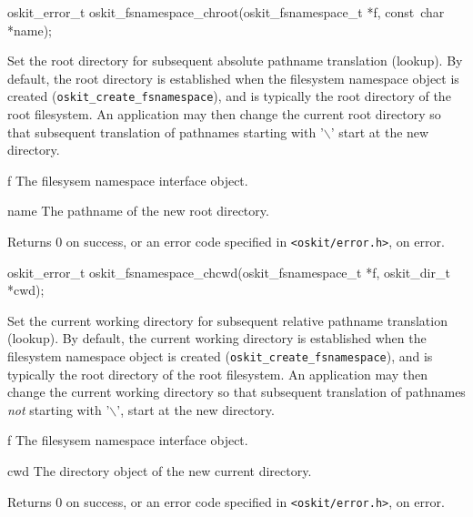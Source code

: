 \begin{apisyn}

	\funcproto oskit_error_t
	oskit_fsnamespace_chroot(oskit_fsnamespace_t *f, const~char *name);
\end{apisyn}
\begin{apidesc}
	Set the root directory for subsequent absolute pathname translation
	(lookup). By default, the root directory is established when the
	filesystem namespace object is created
	(\texttt{oskit_create_fsnamespace}), and is typically the root
	directory of the root filesystem. An application may then change
	the current root directory so that subsequent translation of
	pathnames starting with '$\backslash$' start at the new directory. 
\end{apidesc}
\begin{apiparm}
	\item[f]
		The \oskit{} filesysem namespace interface object.
	\item[name]
		The pathname of the new root directory.
\end{apiparm}
\begin{apiret}
	Returns 0 on success, or an error code specified in
	{\tt <oskit/error.h>}, on error.
\end{apiret}


\begin{apisyn}

	\funcproto oskit_error_t
	oskit_fsnamespace_chcwd(oskit_fsnamespace_t *f, oskit_dir_t *cwd);
\end{apisyn}
\begin{apidesc}
	Set the current working directory for subsequent relative pathname
	translation (lookup). By default, the current working directory is
	established when the filesystem namespace object is created
	(\texttt{oskit_create_fsnamespace}), and is typically the root
	directory of the root filesystem. An application may then change
	the current working directory so that subsequent translation of
	pathnames \emph{not} starting with '$\backslash$', start at the new directory.
\end{apidesc}
\begin{apiparm}
	\item[f]
		The \oskit{} filesysem namespace interface object.
	\item[cwd]
		The directory object of the new current directory.
\end{apiparm}
\begin{apiret}
	Returns 0 on success, or an error code specified in
	{\tt <oskit/error.h>}, on error.
\end{apiret}


